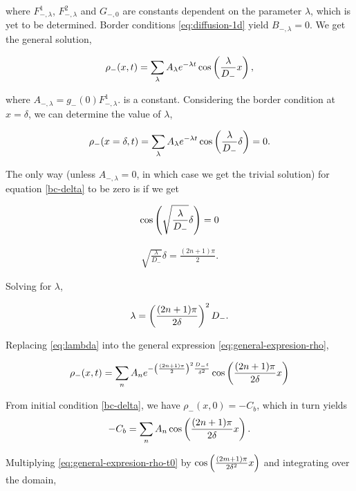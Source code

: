where $F^1_{-,\lambda}$, $F^2_{-,\lambda}$ and $G_{-,0}$ are constants dependent on the parameter $\lambda$, which is yet to be determined. Border conditions \ref{eq:diffusion-1d} yield $B_{-,\lambda} = 0$. We get the general solution,


\begin{align}
	\rho_-(x,t) = \sum_{\lambda} A_\lambda e^{-\lambda t} \cos\left({\frac{\lambda}{D_-} x}\right),
\end{align}

where $A_{-,\lambda} = g_-(0)F^1_{-,\lambda}$. is a constant. Considering the border condition at $x=\delta$, we can determine the value of $\lambda$,


\begin{align}
	\rho_-(x=\delta,t) = \sum_{\lambda} A_\lambda e^{-\lambda t} \cos\left({\frac{\lambda}{D_-} \delta}\right) = 0.
	\label{bc-delta}
\end{align}

The only way (unless $A_{-,\lambda} = 0$, in which case we get the trivial solution) for equation \ref{bc-delta} to be zero is if we get

\begin{align}\nonumber
	\cos\left({\sqrt{\frac{\lambda}{D_-}} \delta}\right) = 0
\end{align}


\begin{align}
	\sqrt{\frac{\lambda}{D_-}} \delta = \frac{(2n+1)\pi}{2}.
\end{align}

Solving for $\lambda$,

\begin{align}
	\lambda  = \left({\frac{(2n+1)\pi}{2\delta}}\right)^2 D_-.
	\label{eq:lambda}
\end{align}

Replacing \ref{eq:lambda} into the general expression \ref{eq:general-expresion-rho},

\begin{align}
	\rho_-(x,t) = \sum_{n} A_n e^{-\left({\frac{(2n+1)\pi}{2}}\right)^2\frac{D_- t}{\delta^2}} \cos\left({\frac{(2n+1)\pi}{2\delta} x}\right)
	\label{bc-delta}
\end{align}

From initial condition \ref{bc-delta}, we have $\rho_- (x,0) = -C_b $, which in turn yields
\begin{align}
	-C_b = \sum_{n}A_n\cos\left({\frac{(2n+1)\pi}{2\delta} x}\right).
	\label{eq:general-expresion-rho-t0}
\end{align}

Multiplying \ref{eq:general-expresion-rho-t0} by $\cos\left({\frac{(2m+1)\pi}{2\delta^2} x}\right)$ and integrating over the domain, 



